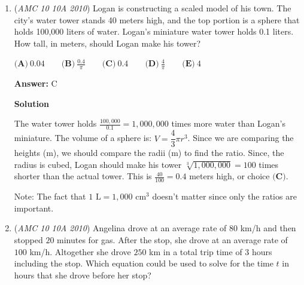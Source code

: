\begin{enumerate}
 $b-3-a+3 = 20$

 Simplify.

 $b-a = 20$

 We need to find $b - a$ for the problem, so the answer is $\boxed{20\ \textbf{(D)}}$




\textbf{Solution 2}

\href{https://artofproblemsolving.com/wiki/index.php?title=Without\_loss\_of\_generality}{Without loss of generality}, let the interval of solutions be $[0, 10]$ (or any real values $[p, 10+p]$). Then, substitute $0$ and $10$ to $x$. This gives $b=23$ and $a=3$. So, the answer is $23-3=\boxed{20\ \textbf{(D)}}$.~ bearjere

 


	\item (\textit{AMC 10 10A 2010}) Logan is constructing a scaled model of his town. The city's water tower stands 40 meters high, and the top portion is a sphere that holds 100,000 liters of water. Logan's miniature water tower holds 0.1 liters. How tall, in meters, should Logan make his tower?


 $\textbf{(A)}\ 0.04 \qquad \textbf{(B)}\ \frac{0.4}{\pi} \qquad \textbf{(C)}\ 0.4 \qquad \textbf{(D)}\ \frac{4}{\pi} \qquad \textbf{(E)}\ 4$

 \textbf{Answer: }C



\textbf{Solution}

The water tower holds $\frac{100,000}{0.1} = 1,000,000$ times more water than Logan's miniature. The volume of a sphere is: $V=\dfrac{4}{3}\pi r^3$. Since we are comparing the heights (m), we should compare the radii (m) to find the ratio. Since, the radius is cubed, Logan should make his tower $\sqrt[3]{1,000,000} = 100$ times shorter than the actual tower. This is $\frac{40}{100} = \boxed{0.4}$ meters high, or choice $\textbf{(C)}$.

 Note: The fact that $1\text{ L}=1,000\text{ cm}^3$ doesn't matter since only the ratios are important.

 


	\item (\textit{AMC 10 10A 2010}) Angelina drove at an average rate of $80$ km/h and then stopped $20$ minutes for gas. After the stop, she drove at an average rate of $100$ km/h. Altogether she drove $250$ km in a total trip time of $3$ hours including the stop. Which equation could be used to solve for the time $t$ in hours that she drove before her stop?



\end{enumerate}
